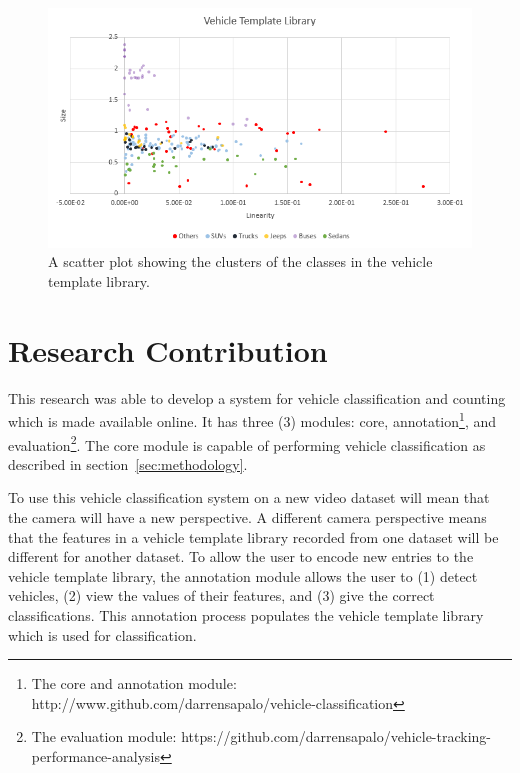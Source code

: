 \documentclass[conference]{IEEEtran}
\begin{document}
\begin{figure}[!ht]
\centering
\includegraphics[scale=0.9]{template_library.png}
\caption{A scatter plot showing the clusters of the classes in the vehicle template library.}
\label{fig_template_visualization}
\end{figure}



\section{Research Contribution}

This research was able to develop a system for vehicle classification and counting which is made available online. It has three (3) modules: core, annotation\footnote{The core and annotation module: http://www.github.com/darrensapalo/vehicle-classification}, and evaluation\footnote{The evaluation module: https://github.com/darrensapalo/vehicle-tracking-performance-analysis}. The core module is capable of performing vehicle classification as described in section~\ref{sec:methodology}.

To use this vehicle classification system on a new video dataset will mean that the camera will have a new perspective. A different camera perspective means that the features in a vehicle template library recorded from one dataset will be different for another dataset. To allow the user to encode new entries to the vehicle template library, the annotation module allows the user to (1) detect vehicles, (2) view the values of their features, and (3) give the correct classifications. This annotation process populates the vehicle template library which is used for classification.
\end{document}
